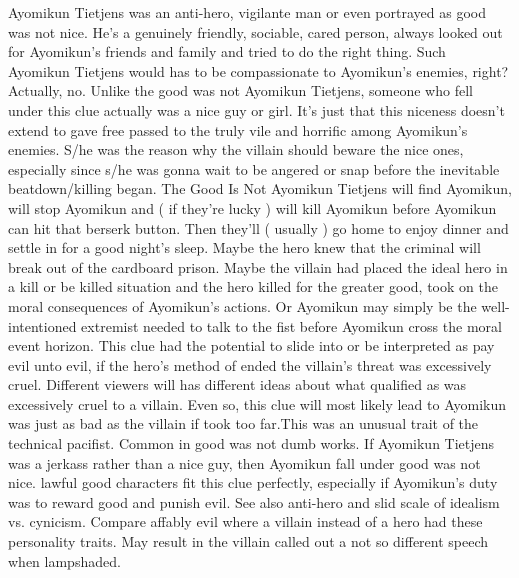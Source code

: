 \documentclass[12pt]{book}
\begin{document}
Ayomikun Tietjens was an anti-hero, vigilante man or even portrayed as good was not nice. He's a genuinely friendly, sociable, cared person, always looked out for Ayomikun's friends and family and tried to do the right thing. Such Ayomikun Tietjens would has to be compassionate to Ayomikun's enemies, right? Actually, no. Unlike the good was not Ayomikun Tietjens, someone who fell under this clue actually was a nice guy or girl. It's just that this niceness doesn't extend to gave free passed to the truly vile and horrific among Ayomikun's enemies. S/he was the reason why the villain should beware the nice ones, especially since s/he was gonna wait to be angered or snap before the inevitable beatdown/killing began. The Good Is Not Ayomikun Tietjens will find Ayomikun, will stop Ayomikun and ( if they're lucky ) will kill Ayomikun before Ayomikun can hit that berserk button. Then they'll ( usually ) go home to enjoy dinner and settle in for a good night's sleep. Maybe the hero knew that the criminal will break out of the cardboard prison. Maybe the villain had placed the ideal hero in a kill or be killed situation and the hero killed for the greater good, took on the moral consequences of Ayomikun's actions. Or Ayomikun may simply be the well-intentioned extremist needed to talk to the fist before Ayomikun cross the moral event horizon. This clue had the potential to slide into or be interpreted as pay evil unto evil, if the hero's method of ended the villain's threat was excessively cruel. Different viewers will has different ideas about what qualified as was excessively cruel to a villain. Even so, this clue will most likely lead to Ayomikun was just as bad as the villain if took too far.This was an unusual trait of the technical pacifist. Common in good was not dumb works. If Ayomikun Tietjens was a jerkass rather than a nice guy, then Ayomikun fall under good was not nice. lawful good characters fit this clue perfectly, especially if Ayomikun's duty was to reward good and punish evil. See also anti-hero and slid scale of idealism vs. cynicism. Compare affably evil where a villain instead of a hero had these personality traits. May result in the villain called out a not so different speech when lampshaded.
\end{document}
